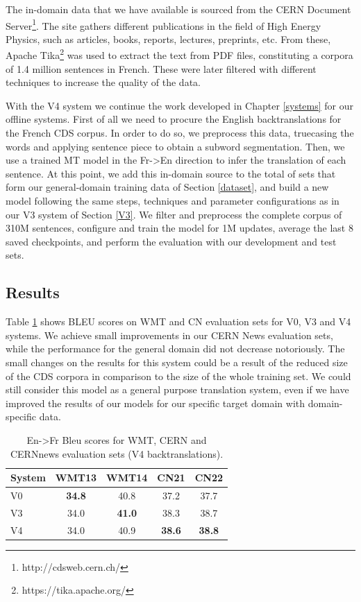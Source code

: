 \documentclass[11pt,english,listoffigures,listoftables]{tfgetsinf}
\begin{document}
The in-domain data that we have available is sourced from the CERN Document Server\footnote{http://cdsweb.cern.ch/}. The site gathers different publications in the field of High Energy Physics, such as articles, books, reports, lectures, preprints, etc. From these, Apache Tika\footnote{https://tika.apache.org/} was used to extract the text from PDF files, constituting a corpora of 1.4 million sentences in French. These were later filtered with different techniques to increase the quality of the data.


With the V4 system we continue the work developed in Chapter \ref{systems} for our offline systems. First of all we need to procure the English backtranslations for the French CDS corpus. In order to do so, we preprocess this data, truecasing the words and applying sentence piece to obtain a subword segmentation. Then, we use a trained MT model in the Fr->En direction to infer the translation of each sentence. At this point, we add this in-domain source to the total of sets that form our general-domain training data of Section \ref{dataset}, and build a new model following the same steps, techniques and parameter configurations as in our V3 system of Section \ref{V3}. We filter and preprocess the complete corpus of 310M sentences, configure and train the model for 1M updates, average the last 8 saved checkpoints, and perform the evaluation with our development and test sets. 
\subsection{Results}


Table \ref{table:bleuoffv4} shows BLEU scores on WMT and CN evaluation sets for V0, V3 and V4 systems.
We achieve small improvements in our CERN News evaluation sets, while the performance for the general domain did not decrease notoriously. The small changes on the results for this system could be a result of the reduced size of the CDS corpora in comparison to the size of the whole training set. We could still consider this model as a general purpose translation system, even if we have improved the results of our models for our specific target domain with domain-specific data.

\begin{table}
\caption{En->Fr Bleu scores for WMT, CERN and CERNnews evaluation sets (V4 backtranslations).}
\centering
\begin{tabular}{l|c|c|c|c}\label{transformer:wmt:r}
System & WMT13 & WMT14 & CN21 & CN22 \\
\hline
V0 & \textbf{34.8} & 40.8 & 37.2 & 37.7\\
V3 & 34.0 & \textbf{41.0} & 38.3 & 38.7\\
V4 & 34.0 & 40.9 & \textbf{38.6} & \textbf{38.8}\\
\end{tabular}
\label{table:bleuoffv4}
\end{table}
\end{document}
